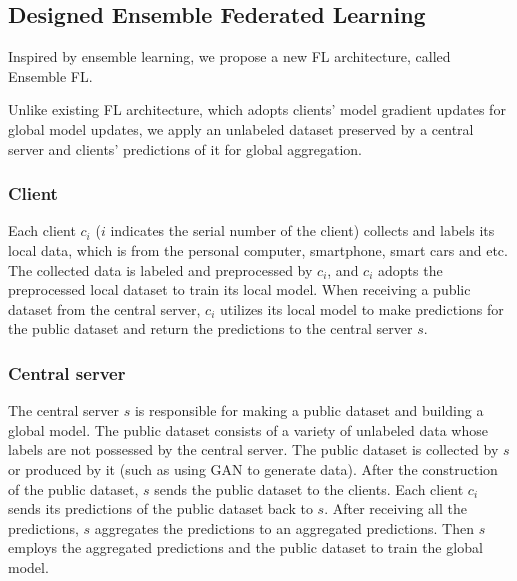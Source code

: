 \documentclass[journal]{IEEEtran}
\begin{document}
\subsection{Designed Ensemble Federated Learning}
Inspired by ensemble learning, we propose a new FL architecture, called Ensemble FL.
\par Unlike existing FL architecture, which adopts clients' model gradient updates for global model updates, we apply an unlabeled dataset preserved by a central server and clients' predictions of it for global aggregation.
\subsubsection{{Client}} Each client {$c_{i}$} ($i$ indicates the serial number of the client) collects and labels its local data, which is from the personal computer, smartphone, smart cars and etc. The collected data is labeled and preprocessed by {$c_{i}$}, and {$c_{i}$} adopts the preprocessed local dataset to train its local model. When receiving a public dataset from the central server, {$c_{i}$} utilizes its local model to make predictions for the public dataset and return the predictions to the central server {$s$}.
\subsubsection{{Central server}} The central server {$s$} is responsible for making a public dataset and building a global model. The public dataset consists of a variety of unlabeled data whose labels are not possessed by the central server. The public dataset is collected by {$s$} or produced by it (such as using GAN to generate data). After the construction of the public dataset, {$s$} sends the public dataset to the clients. Each client {$c_{i}$} sends its predictions of the public dataset back to {$s$}. After receiving all the predictions, {$s$} aggregates the predictions to an aggregated predictions. Then {$s$} employs the aggregated predictions and the public dataset to train the global model.
\end{document}
